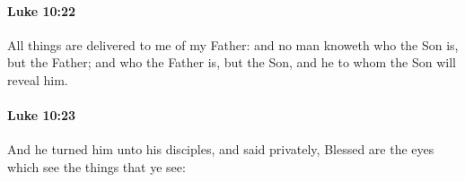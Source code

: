 		\paragraph{Luke 10:22} %
			\label{LUKE-10-22}

			All things are delivered to me of my Father: and no man knoweth who the Son is, but the Father; and who the Father is, but the Son, and he to whom the Son will reveal him.

			\begin{framed}
			\scriptsize
				\begin{compactdesc}
					\item[SBLG] 
				\end{compactdesc}
			\end{framed}

		\paragraph{Luke 10:23} %
			\label{LUKE-10-23}

			And he turned him unto his disciples, and said privately, Blessed are the eyes which see the things that ye see:

